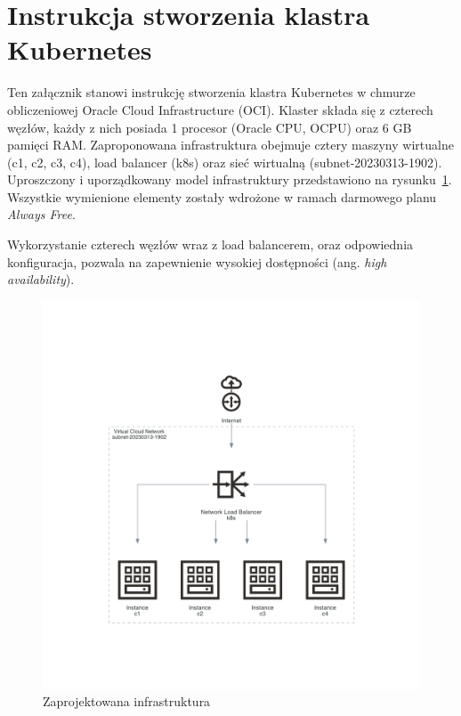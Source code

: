 \newpage

\section{Instrukcja stworzenia klastra Kubernetes}\label{sec:instrukcja-stworzenia-klastra-kubernetes}

Ten załącznik stanowi instrukcję stworzenia klastra Kubernetes w chmurze obliczeniowej Oracle Cloud Infrastructure (OCI).
Klaster składa się z czterech węzłów, każdy z nich posiada 1 procesor (Oracle CPU, OCPU) oraz 6 GB pamięci RAM\@.
Zaproponowana infrastruktura obejmuje cztery maszyny wirtualne (c1, c2, c3, c4), load balancer (k8s) oraz sieć wirtualną (subnet-20230313-1902).
Uproszczony i uporządkowany model infrastruktury przedstawiono na rysunku~\ref{fig:infrastructure}.
Wszystkie wymienione elementy zostały wdrożone w ramach darmowego planu \emph{Always Free}.

Wykorzystanie czterech węzłów wraz z load balancerem, oraz odpowiednia konfiguracja, pozwala na zapewnienie wysokiej dostępności (ang. \emph{high availability}).

\begin{figure}[H]
    \centering
    \includegraphics[width=\textwidth]{img/oci-infrastructure}
    \caption{Zaprojektowana infrastruktura}
    \label{fig:infrastructure}
\end{figure}

